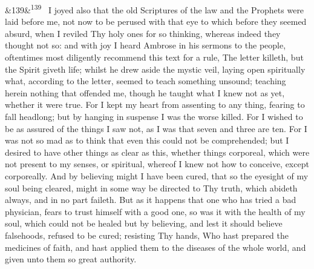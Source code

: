 \documentclass[12pt]{article}
\newcommand{\para}[1][]{\par\noindent\ifx&#1&\else\textsuperscript{\footnotesize #1}~\fi}
\begin{document}
\para[139] I joyed also that the old Scriptures of the law and the Prophets were laid before me, not now to be perused with that eye to which before they seemed absurd, when I reviled Thy holy ones for so thinking, whereas indeed they thought not so: and with joy I heard Ambrose in his sermons to the people, oftentimes most diligently recommend this text for a rule, The letter killeth, but the Spirit giveth life; whilst he drew aside the mystic veil, laying open spiritually what, according to the letter, seemed to teach something unsound; teaching herein nothing that offended me, though he taught what I knew not as yet, whether it were true. For I kept my heart from assenting to any thing, fearing to fall headlong; but by hanging in suspense I was the worse killed. For I wished to be as assured of the things I saw not, as I was that seven and three are ten. For I was not so mad as to think that even this could not be comprehended; but I desired to have other things as clear as this, whether things corporeal, which were not present to my senses, or spiritual, whereof I knew not how to conceive, except corporeally. And by believing might I have been cured, that so the eyesight of my soul being cleared, might in some way be directed to Thy truth, which abideth always, and in no part faileth. But as it happens that one who has tried a bad physician, fears to trust himself with a good one, so was it with the health of my soul, which could not be healed but by believing, and lest it should believe falsehoods, refused to be cured; resisting Thy hands, Who hast prepared the medicines of faith, and hast applied them to the diseases of the whole world, and given unto them so great authority.
\end{document}
